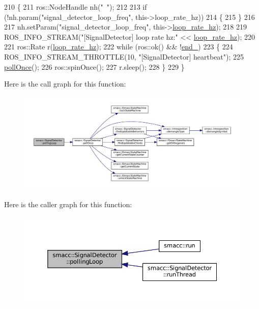 \begin{DoxyCode}
210 \{
211     ros::NodeHandle nh(\textcolor{stringliteral}{"~"});
212 
213     \textcolor{keywordflow}{if} (!nh.param(\textcolor{stringliteral}{"signal\_detector\_loop\_freq"}, this->loop\_rate\_hz))
214     \{
215     \}
216 
217     nh.setParam(\textcolor{stringliteral}{"signal\_detector\_loop\_freq"}, this->\hyperlink{classsmacc_1_1SignalDetector_a41a2ae4262ed350f46d8b886bdc1dfa5}{loop\_rate\_hz});
218 
219     ROS\_INFO\_STREAM(\textcolor{stringliteral}{"[SignalDetector] loop rate hz:"} << \hyperlink{classsmacc_1_1SignalDetector_a41a2ae4262ed350f46d8b886bdc1dfa5}{loop\_rate\_hz});
220 
221     ros::Rate r(\hyperlink{classsmacc_1_1SignalDetector_a41a2ae4262ed350f46d8b886bdc1dfa5}{loop\_rate\_hz});
222     \textcolor{keywordflow}{while} (ros::ok() && !\hyperlink{classsmacc_1_1SignalDetector_aaee266393c01693528a2d74b1f2354a2}{end\_})
223     \{
224         ROS\_INFO\_STREAM\_THROTTLE(10, \textcolor{stringliteral}{"[SignalDetector] heartbeat"});
225         \hyperlink{classsmacc_1_1SignalDetector_a9a116479e23259f3a5d5d4a47278afd5}{pollOnce}();
226         ros::spinOnce();
227         r.sleep();
228     \}
229 \}
\end{DoxyCode}
Here is the call graph for this function\+:
\nopagebreak
\begin{figure}[H]
\begin{center}
\leavevmode
\includegraphics[width=350pt]{classsmacc_1_1SignalDetector_a2665e66cdae9f6533c64bbcecf3fa199_cgraph}
\end{center}
\end{figure}
Here is the caller graph for this function\+:
\nopagebreak
\begin{figure}[H]
\begin{center}
\leavevmode
\includegraphics[width=350pt]{classsmacc_1_1SignalDetector_a2665e66cdae9f6533c64bbcecf3fa199_icgraph}
\end{center}
\end{figure}
